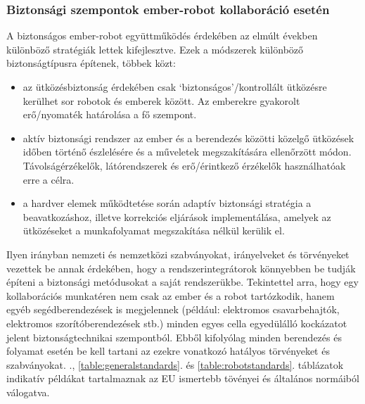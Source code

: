 \documentclass[../documentation.tex]{subfiles}
\begin{document}
\subsubsection{Biztonsági szempontok ember-robot kollaboráció esetén} \label{safetypoints}
A biztonságos ember-robot együttműködés érdekében az elmúlt években különböző stratégiák lettek kifejlesztve. Ezek a módszerek különböző biztonságtípusra építenek, többek közt\cite{safehrc}:
\begin{itemize}
	\item az ütközésbiztonság érdekében csak `biztonságos'/kontrollált ütközésre kerülhet sor robotok és emberek között. Az emberekre gyakorolt erő/nyomaték határolása a fő szempont.
	\item aktív biztonsági rendszer az ember és a berendezés közötti közelgő ütközések időben történő észlelésére és a műveletek megszakítására ellenőrzött módon. Távolságérzékelők, látórendszerek és erő/érintkező érzékelők használhatóak erre a célra.
	\item a hardver elemek működtetése során adaptív biztonsági stratégia a beavatkozáshoz, illetve korrekciós eljárások implementálása, amelyek az ütközéseket a munkafolyamat megszakítása nélkül kerülik el.
\end{itemize}
Ilyen irányban nemzeti és nemzetközi szabványokat, irányelveket és törvényeket vezettek be annak érdekében, hogy a rendszerintegrátorok könnyebben be tudják építeni a biztonsági metódusokat a saját rendszerükbe. Tekintettel arra, hogy egy kollaborációs munkatéren nem csak az ember és a robot tartózkodik, hanem egyéb segédberendezések is megjelennek (például: elektromos csavarbehajtók, elektromos szorítóberendezések stb.) minden egyes cella egyedülálló kockázatot jelent biztonságtechnikai szempontból. Ebből kifolyólag minden berendezés és folyamat esetén be kell tartani az ezekre vonatkozó hatályos törvényeket és szabványokat. ., \ref{table:generalstandards}. és \ref{table:robotstandards}. táblázatok indikatív példákat tartalmaznak az EU ismertebb tövényei és általános normáiból válogatva.
\end{document}
